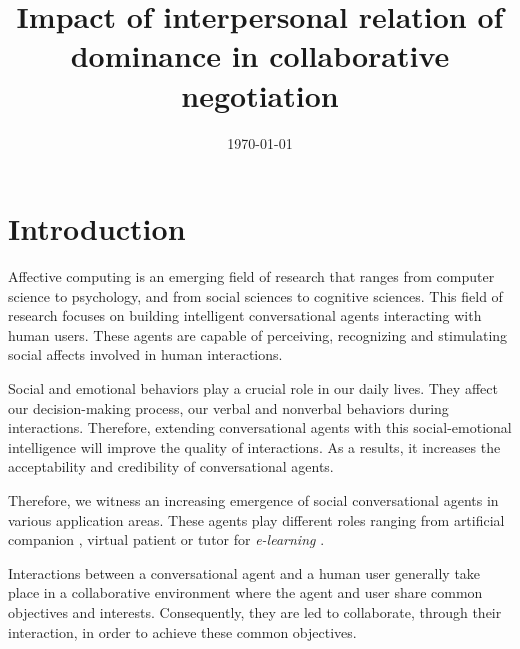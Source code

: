\documentclass[10pt, a4paper]{article} %
\title{Impact of interpersonal relation of dominance in collaborative negotiation} %
\date{\today} %
\begin{document}
\maketitle %

\thispagestyle{firstpage} %




\section{Introduction}

Affective computing is an emerging field of research that ranges from computer science to psychology, and from social sciences to cognitive sciences. This field of research focuses on building intelligent conversational agents interacting with human users. These agents are capable of perceiving, recognizing and stimulating social affects involved in human interactions.

Social and emotional behaviors play a crucial role in our daily lives. They affect our decision-making process, our verbal and nonverbal behaviors during interactions. Therefore, extending conversational agents with this social-emotional intelligence will improve the quality of interactions. As a results, it increases the acceptability and credibility of conversational agents. 

Therefore, we witness an increasing emergence of social conversational agents in various application areas.  These agents play different roles ranging from artificial companion \cite{ring2013addressing,sidner2013always}, virtual patient \cite{kenny2007virtual,kleinheksel2017virtual} or tutor for \emph{e-learning}  \cite{kerly2008calmsystem,kerry2009conversational}.

Interactions between a conversational agent and a human user generally take place in a collaborative environment where the agent and user share common objectives and interests. 
Consequently, they are led to collaborate, through their interaction, in order to achieve these common objectives. 
\end{document}
